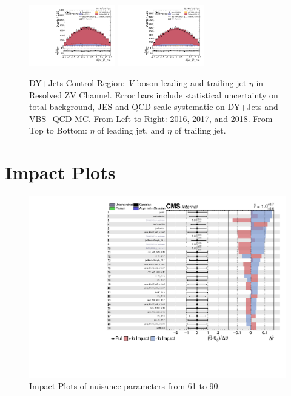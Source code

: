 \begin{figure}[!ht]
  \includegraphics[width=0.335\textwidth]{analysis_plots/2017_zjj/cr_vjets_l/dijet_j2_eta.pdf} \hspace{-10pt}
  \includegraphics[width=0.335\textwidth]{analysis_plots/2018_zjj/cr_vjets_l/dijet_j2_eta.pdf} \hspace{-10pt} \\
  \caption[DY+Jets Control Region: \textit{V} boson leading and trailing jet \( \eta \) in Resolved ZV Channel]%
  {DY+Jets Control Region: \textit{V} boson leading and trailing jet \( \eta \) in Resolved ZV Channel.
    Error bars include statistical uncertainty on total background,
    JES and QCD scale systematic on DY+Jets and VBS\_QCD MC\@. From Left to Right: 2016,
    2017, and 2018. From Top to Bottom: \( \eta \) of leading jet, and \( \eta \) of trailing jet.}%
  \label{fig:zjj-cr-vjets-l-dijet2-pt-eta-m}
\end{figure}

\clearpage
\section{
  Impact Plots
 }\label{app2:impact-plots}

\begin{figure}[!ht]
  \centering
  \includegraphics[width=\textwidth,page=3]{analysis_plots/impact_plots/impacts_datacard_run2_z.pdf}
  \caption{Impact Plots of nuisance parameters from 61 to 90.}\label{fig:vbs-impact-plots-page3}
\end{figure}

